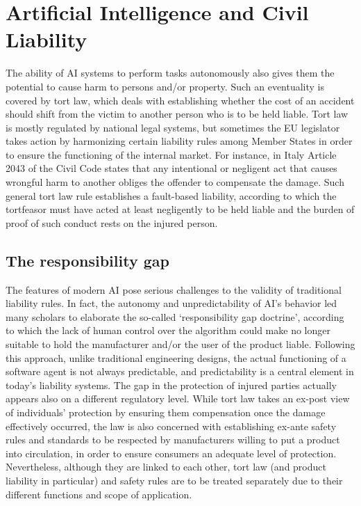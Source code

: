 \section{Artificial Intelligence and Civil Liability}

The ability of AI systems to perform tasks autonomously also gives them the potential to cause harm to persons and/or property. Such an eventuality is covered by tort law, which deals with establishing whether the cost of an accident should shift from the victim to another person who is to be held liable. Tort law is mostly regulated by national legal systems, but sometimes the EU legislator takes action by harmonizing certain liability rules among Member States in order to ensure the functioning of the internal market. For instance, in Italy Article 2043 of the Civil Code states that any intentional or negligent act that causes wrongful harm to another obliges the offender to compensate the damage. Such general tort law rule establishes a fault-based liability, according to which the tortfeasor must have acted at least negligently to be held liable and the burden of proof of such conduct rests on the injured person.

\subsection{The responsibility gap}

The features of modern AI pose serious challenges to the validity of traditional liability rules. In fact, the autonomy and unpredictability of AI’s behavior led many scholars to elaborate the so-called ‘responsibility gap doctrine’, according to which the lack of human control over the algorithm could make no longer suitable to hold the manufacturer and/or the user of the product liable. Following this approach, unlike traditional engineering designs, the actual functioning of a software agent is not always predictable, and predictability is a central element in today’s liability systems. The gap in the protection of injured parties actually appears also on a different regulatory level. While tort law takes an ex-post view of individuals’ protection by ensuring them compensation once the damage effectively occurred, the law is also concerned with establishing ex-ante safety rules and standards to be respected by manufacturers willing to put a product into circulation, in order to ensure consumers an adequate level of protection. Nevertheless, although they are linked to each other, tort law (and product liability in particular) and safety rules are to be treated separately due to their different functions and scope of application.

